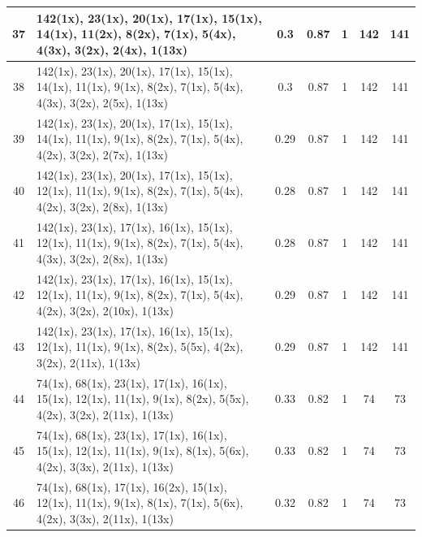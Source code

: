 \begin{small}
\begin{longtable}{|c|p{4cm}|c|c|c|c|c|}
  37 & 142(1x), 23(1x), 20(1x), 17(1x), 15(1x), 14(1x), 11(2x), 8(2x), 7(1x), 5(4x), 4(3x), 3(2x), 2(4x), 1(13x) & \cellcolor{colorGood}  0.3 & \cellcolor{colorGood} 0.87 & 1 & 142 & \cellcolor{colorBad} 141 \\   \hline
  38 & 142(1x), 23(1x), 20(1x), 17(1x), 15(1x), 14(1x), 11(1x), 9(1x), 8(2x), 7(1x), 5(4x), 4(3x), 3(2x), 2(5x), 1(13x) & \cellcolor{colorGood}  0.3 & \cellcolor{colorGood} 0.87 & 1 & 142 & \cellcolor{colorBad} 141 \\   \hline
  39 & 142(1x), 23(1x), 20(1x), 17(1x), 15(1x), 14(1x), 11(1x), 9(1x), 8(2x), 7(1x), 5(4x), 4(2x), 3(2x), 2(7x), 1(13x) & \cellcolor{colorGood}  0.29 & \cellcolor{colorGood} 0.87 & 1 & 142 & \cellcolor{colorBad} 141 \\   \hline
  40 & 142(1x), 23(1x), 20(1x), 17(1x), 15(1x), 12(1x), 11(1x), 9(1x), 8(2x), 7(1x), 5(4x), 4(2x), 3(2x), 2(8x), 1(13x) & \cellcolor{colorGood}  0.28 & \cellcolor{colorGood} 0.87 & 1 & 142 & \cellcolor{colorBad} 141 \\   \hline
  41 & 142(1x), 23(1x), 17(1x), 16(1x), 15(1x), 12(1x), 11(1x), 9(1x), 8(2x), 7(1x), 5(4x), 4(3x), 3(2x), 2(8x), 1(13x) & \cellcolor{colorGood}  0.28 & \cellcolor{colorGood} 0.87 & 1 & 142 & \cellcolor{colorBad} 141 \\   \hline
  42 & 142(1x), 23(1x), 17(1x), 16(1x), 15(1x), 12(1x), 11(1x), 9(1x), 8(2x), 7(1x), 5(4x), 4(2x), 3(2x), 2(10x), 1(13x) & \cellcolor{colorGood}  0.29 & \cellcolor{colorGood} 0.87 & 1 & 142 & \cellcolor{colorBad} 141 \\   \hline
  43 & 142(1x), 23(1x), 17(1x), 16(1x), 15(1x), 12(1x), 11(1x), 9(1x), 8(2x), 5(5x), 4(2x), 3(2x), 2(11x), 1(13x) & \cellcolor{colorGood}  0.29 & \cellcolor{colorGood} 0.87 & 1 & 142 & \cellcolor{colorBad} 141 \\   \hline
  44 & 74(1x), 68(1x), 23(1x), 17(1x), 16(1x), 15(1x), 12(1x), 11(1x), 9(1x), 8(2x), 5(5x), 4(2x), 3(2x), 2(11x), 1(13x) & \cellcolor{colorGood}  0.33 & \cellcolor{colorGood} 0.82 & 1 & 74 & \cellcolor{colorBad} 73 \\   \hline
  45 & 74(1x), 68(1x), 23(1x), 17(1x), 16(1x), 15(1x), 12(1x), 11(1x), 9(1x), 8(1x), 5(6x), 4(2x), 3(3x), 2(11x), 1(13x) & \cellcolor{colorGood}  0.33 & \cellcolor{colorGood} 0.82 & 1 & 74 & \cellcolor{colorBad} 73 \\   \hline
  46 & 74(1x), 68(1x), 17(1x), 16(2x), 15(1x), 12(1x), 11(1x), 9(1x), 8(1x), 7(1x), 5(6x), 4(2x), 3(3x), 2(11x), 1(13x) & \cellcolor{colorGood}  0.32 & \cellcolor{colorGood} 0.82 & 1 & 74 & \cellcolor{colorBad} 73 \\   \hline

\end{longtable}
\end{small}
